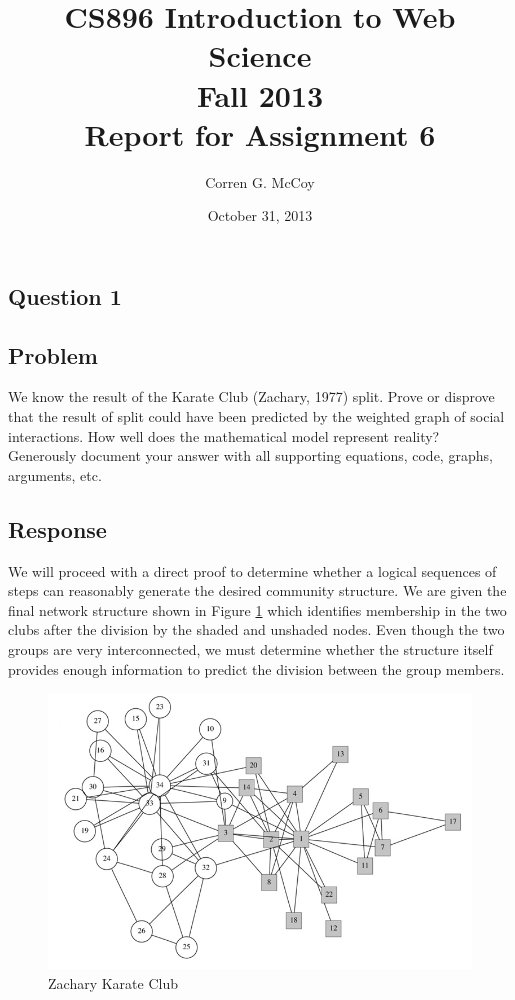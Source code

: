 \documentclass[letterpaper,11pt]{report}
\begin{document}
 
\begin{savenotes}
\pagestyle{plain}
\title{CS896 Introduction to Web Science\\Fall 2013\\Report for Assignment 6}
\author{Corren G. McCoy}
 
\date{October 31, 2013}
\maketitle

\renewcommand*\thesection{\arabic{section}}
\setcounter{section}{0}

\setcounter{tocdepth}{4}
\tableofcontents
 \listoffigures
 \listoftables
\newpage


\section{Question 1}
\subsection{Problem}We know the result of the Karate Club (Zachary, 1977)\cite{zachary1977information} split. Prove or disprove that the result of split could have been predicted by the weighted graph of social interactions. How well does the mathematical model represent reality? Generously document your answer with all supporting equations, code, graphs, arguments, etc.
\subsection{Response}We will proceed with a direct proof to determine whether a logical sequences of steps can reasonably generate the desired community structure. We are given the final network structure shown in Figure \ref{fig:zachary} which identifies membership in the two clubs after the division by the shaded and unshaded nodes. Even though the two groups are very interconnected, we must determine whether the structure itself provides enough information to predict the division between the group members.

\begin{figure}[htbp]
	\centering
		\includegraphics[width=1.00\textwidth]{zachary.png}
	\caption{Zachary Karate Club}
	\label{fig:zachary}
\end{figure}


\end{savenotes}
\end{document}
